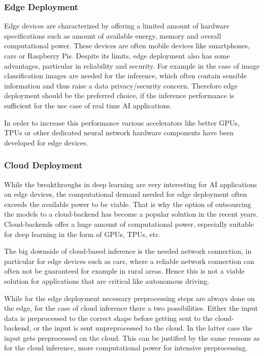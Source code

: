 \subsubsection{Edge Deployment}
Edge devices are characterized by offering a limited amount of hardware specifications such as amount of available energy, memory and overall computational power.
These devices are often mobile devices like smartphones, cars or Raspberry Pis.
Despite its limits, edge deployment also has some advantages, particular in reliability and security. 
For example in the case of image classification images are needed for the inference, which often contain sensible information and thus raise a data privacy/security concern.
Therefore edge deployment should be the preferred choice, if the inference performance is sufficient for the use case of real time AI applications.

In order to increase this performance various accelerators like better GPUs, TPUs or other dedicated neural network hardware components have been developed for edge devices.



\subsubsection{Cloud Deployment}
While the breakthroughs in deep learning are very interesting for AI applications on edge devices, the computational demand needed for edge deployment often exceeds the available power to be viable.
That is why the option of outsourcing the models to a cloud-backend has become a popular solution in the recent years.
Cloud-backends offer a huge amount of computational power, especially suitable for deep learning in the form of GPUs, TPUs, etc.


The big downside of cloud-based inference is the needed network connection, in particular for edge devices such as cars, where a reliable network connection can often not be guaranteed for example in rural areas. Hence this is not a viable solution for applications that are critical like autonomous driving.

While for the edge deployment necessary preprocessing steps are always done on the edge, for the case of cloud inference there a two possibilities. Either the input data is preprocessed to the correct shape before getting sent to the cloud-backend, or the input is sent unpreprocessed to the cloud. 
In the latter case the input gets preprocessed on the cloud. 
This can be justified by the same reasons as for the cloud inference, more computational power for intensive preprocessing.



